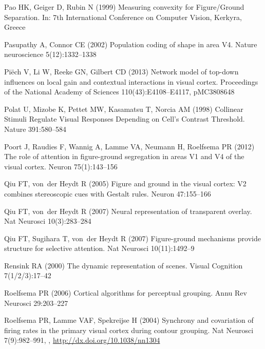 \begin{thebibliography}{90}
Pao HK, Geiger D, Rubin N (1999) {M}easuring convexity for {F}igure/{G}round
  {S}eparation. In: 7th International Conference on Computer Vision, Kerkyra,
  Greece

Pasupathy A, Connor CE (2002) {P}opulation coding of shape in area {V}4. Nature
  neuroscience 5(12):1332--1338

Pi{\"e}ch V, Li W, Reeke GN, Gilbert CD (2013) {N}etwork model of top-down
  influences on local gain and contextual interactions in visual cortex.
  Proceedings of the National Academy of Sciences 110(43):E4108--E4117,
  pMC3808648

Polat U, Mizobe K, Pettet MW, Kasamatsu T, Norcia AM (1998) {C}ollinear
  {S}timuli {R}egulate {V}isual {R}esponses {D}epending on {C}ell's {C}ontrast
  {T}hreshold. Nature 391:580--584

Poort J, Raudies F, Wannig A, Lamme VA, Neumann H, Roelfsema PR (2012) {T}he
  role of attention in figure-ground segregation in areas {V1} and {V4} of the
  visual cortex. Neuron 75(1):143--156

Qiu FT, von~der Heydt R (2005) {F}igure and ground in the visual cortex: {V}2
  combines stereoscopic cues with {G}estalt rules. Neuron 47:155--166

Qiu FT, von~der Heydt R (2007) {N}eural representation of transparent overlay.
  Nat Neurosci 10(3):283--284

Qiu FT, Sugihara T, von~der Heydt R (2007) {F}igure-ground mechanisms provide
  structure for selective attention. Nat Neurosci 10(11):1492--9

Rensink RA (2000) {T}he dynamic representation of scenes. Visual Cognition
  7(1/2/3):17--42

Roelfsema PR (2006) {C}ortical algorithms for perceptual grouping. Annu Rev
  Neurosci 29:203--227

Roelfsema PR, Lamme VAF, Spekreijse H (2004) {S}ynchrony and covariation of
  firing rates in the primary visual cortex during contour grouping. Nat
  Neurosci 7(9):982--991, ,
  \urlprefix\url{http://dx.doi.org/10.1038/nn1304}


\end{thebibliography}
